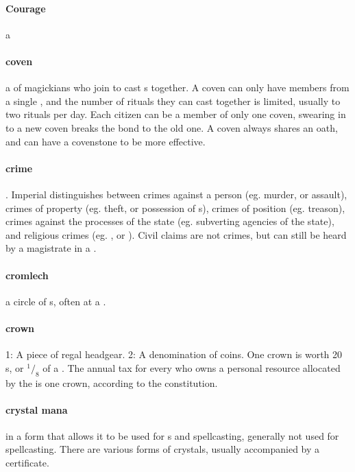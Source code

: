 \paragraph{Courage} a 
\paragraph{coven} a  of magickians who join to cast s together. A coven can only have members from a single , and the number of rituals they can cast together is limited, usually to two rituals per day. Each citizen can be a member of only one coven, swearing in to a new coven breaks the bond to the old one. A coven always shares an oath, and can have a covenstone to be more effective. 
\paragraph{crime} . Imperial  distinguishes between crimes against a person (eg. murder, or assault), crimes of property (eg. theft, or possession of s), crimes of position (eg. treason), crimes against the processes of the state (eg. subverting agencies of the state), and religious crimes (eg. , or ). Civil claims are not crimes, but can still be heard by a magistrate in a . 
\paragraph{cromlech}  a circle of s, often at a .
\paragraph{crown} 1: A piece of regal headgear. 2: A denomination of coins. One crown is worth 20 s, or $^1/_8$ of a . The annual tax for every  who owns a personal resource allocated by the  is one crown, according to the constitution.
\paragraph{crystal mana}  in a form that allows it to be used for s and spellcasting, generally not used for spellcasting. There are various forms of crystals, usually accompanied by a certificate.
